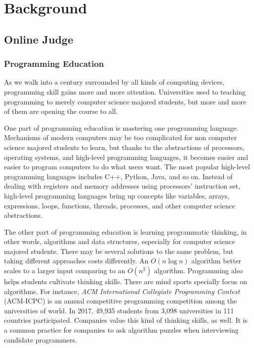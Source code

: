 
\chapter{Background}
\label{chap:background}

\section{Online Judge}
    
    \subsection{Programming Education}

        As we walk into a century surrounded by all kinds of computing devices,
        programming skill gains more and more attention.  %
        Universities used to teaching programming to merely computer science majored students,
        but more and more of them are opening the course to all.  %

        One part of programming education is mastering one programming language.
        Mechanisms of modern computers may be too complicated for non computer science majored students to learn,
        but thanks to the abstractions of processors, operating systems, and high-level programming languages,
        it becomes easier and easier to program computers to do what users want.
        The most popular high-level programming languages includes C++, Python, Java, and so on. %
        Instead of dealing with registers and memory addresses using processors' instruction set,
        high-level programming languages bring up concepts like variables, arrays, expressions, loops, functions,
        threads, processes, and other computer science abstractions.

        The other part of programming education is learning programmatic thinking, in other words,
        algorithms and data structures, especially for computer science majored students.
        There may be several solutions to the same problem, but taking different approaches costs differently.
        An $O(n\log n)$ algorithm better scales to a larger input comparing to an $O(n^2)$ algorithm.
        Programming also helps students cultivate thinking skills.
        There are mind sports specially focus on algorithms.
        For instance, \emph{ACM International Collegiate Programming Contest} (ACM-ICPC) is an annual
        competitive programming competition among the universities of world.
        In 2017, 49,935 students from 3,098 universities in 111 countries participated. %
        Companies value this kind of thinking skills, as well.
        It is a common practice for companies to ask algorithm puzzles when interviewing candidate programmers.

